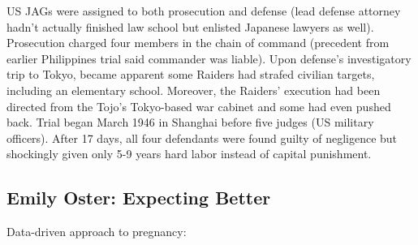 \documentclass[
]{article}
\begin{document}
US JAGs were assigned to both prosecution and defense (lead defense
attorney hadn't actually finished law school but enlisted Japanese
lawyers as well). Prosecution charged four members in the chain of
command (precedent from earlier Philippines trial said commander was
liable). Upon defense's investigatory trip to Tokyo, became apparent
some Raiders had strafed civilian targets, including an elementary
school. Moreover, the Raiders' execution had been directed from the
Tojo's Tokyo-based war cabinet and some had even pushed back. Trial
began March 1946 in Shanghai before five judges (US military officers).
After 17 days, all four defendants were found guilty of negligence but
shockingly given only 5-9 years hard labor instead of capital
punishment.

\hypertarget{emily-oster-expecting-better}{%
\subsection{Emily Oster: Expecting
Better}\label{emily-oster-expecting-better}}

Data-driven approach to pregnancy:
\end{document}
